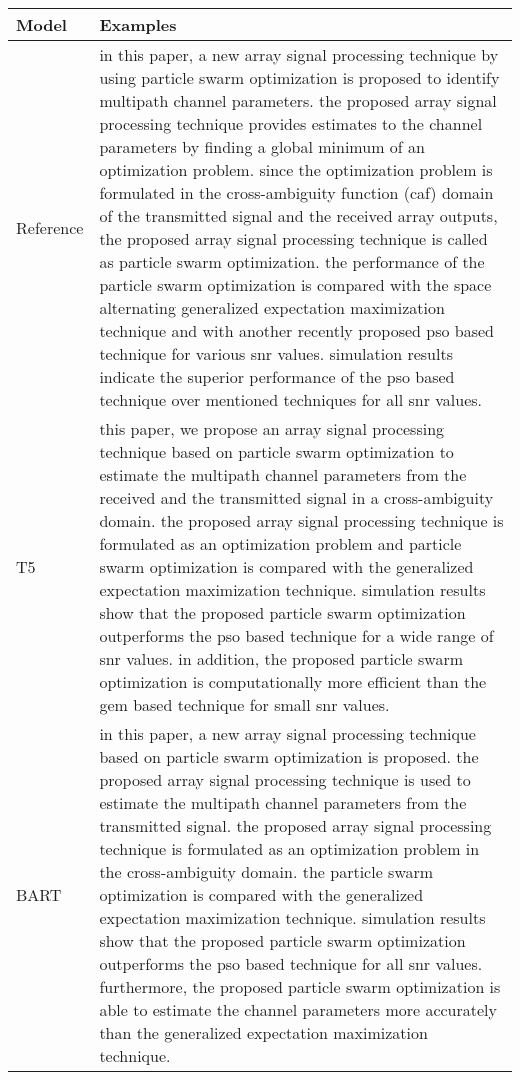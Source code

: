 \documentclass[11pt]{article}
\begin{document}
\begin{table*}[h]
\begin{center}
\begin{tabular}{lp{12cm}}
\toprule
 \textbf{Model}       & \textbf{Examples}    \\
\midrule
    Reference &  in this paper, a new array signal processing technique by using particle swarm optimization is proposed to identify multipath channel parameters. the proposed array signal processing technique provides estimates to the channel parameters by finding a global minimum of an optimization problem. since the optimization problem is formulated in the cross-ambiguity function (caf) domain of the transmitted signal and the received array outputs, the proposed array signal processing technique is called as particle swarm optimization. the performance of the particle swarm optimization is compared with the space alternating generalized expectation maximization technique and with another recently proposed pso based technique for various snr values. simulation results indicate the superior performance of the pso based technique over mentioned techniques for all snr values. \\
    \midrule
 T5  & this paper, we propose an array signal processing technique based on particle swarm optimization to estimate the multipath channel parameters from the received and the transmitted signal in a cross-ambiguity domain. the proposed array signal processing technique is formulated as an optimization problem and particle swarm optimization is compared with the generalized expectation maximization technique. simulation results show that the proposed particle swarm optimization outperforms the pso based technique for a wide range of snr values. in addition, the proposed particle swarm optimization is computationally more efficient than the gem based technique for small snr values. \\
 \midrule
 BART  & in this paper, a new array signal processing technique based on particle swarm optimization is proposed. the proposed array signal processing technique is used to estimate the multipath channel parameters from the transmitted signal. the proposed array signal processing technique is formulated as an optimization problem in the cross-ambiguity domain. the particle swarm optimization is compared with the generalized expectation maximization technique. simulation results show that the proposed particle swarm optimization outperforms the pso based technique for all snr values. furthermore, the proposed particle swarm optimization is able to estimate the channel parameters more accurately than the generalized expectation maximization technique. \\

\end{tabular}
\end{center}
\end{table*}
\end{document}
